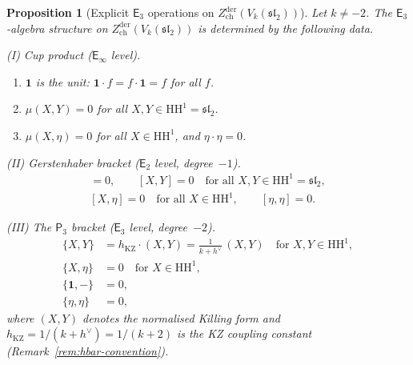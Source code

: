 \documentclass[11pt,reqno]{amsart}
\newtheorem{proposition}[theorem]{Proposition}
\theoremstyle{definition}
\theoremstyle{remark}
\newcommand{\HH}{\mathrm{HH}}
\newcommand{\Etwo}{\mathsf{E}_{2}}
\providecommand{\Ethree}{\mathsf{E}_{3}}
\newcommand{\Einf}{\mathsf{E}_{\infty}}
\newcommand{\Pthree}{\mathsf{P}_{3}}
\numberwithin{equation}{section}
\begin{document}
\begin{proposition}[Explicit $\Ethree$ operations on
$Z^{\mathrm{der}}_{\mathrm{ch}}(V_k(\mathfrak{sl}_2))$]
\label{prop:e3-explicit-sl2}
Let $k \neq -2$.
The $\Ethree$-algebra structure on
$Z^{\mathrm{der}}_{\mathrm{ch}}(V_k(\mathfrak{sl}_2))$
is determined by the following data.

\smallskip
\noindent
\textup{(I) Cup product} ($\Einf$ level).
\begin{enumerate}[label=\textup{(\alph*)}]
\item $\mathbf{1}$ is the unit:
  $\mathbf{1} \cdot f = f \cdot \mathbf{1} = f$ for all $f$.
\item
  $\mu(X, Y) = 0$ for all $X, Y \in \HH^1 = \mathfrak{sl}_2$.
\item
  $\mu(X, \eta) = 0$ for all $X \in \HH^1$, and
  $\eta \cdot \eta = 0$.
\end{enumerate}

\smallskip
\noindent
\textup{(II) Gerstenhaber bracket} ($\Etwo$ level,
degree~$-1$).
\begin{gather*}
  [\mathbf{1}, -] = 0, \qquad
  [X, Y] = 0 \quad \text{for all }
  X, Y \in \HH^1 = \mathfrak{sl}_2, \\
  [X, \eta] = 0 \quad \text{for all } X \in \HH^1,
  \qquad [\eta, \eta] = 0.
\end{gather*}

\smallskip
\noindent
\textup{(III) The $\Pthree$ bracket} ($\Ethree$ level,
degree~$-2$).
\begin{align}
  \label{eq:e3-p3-killing}
  \{X, Y\}
  &= h_{\mathrm{KZ}} \cdot (X, Y)
  = \frac{1}{k + h^\vee}\,(X, Y)
  \quad \text{for } X, Y \in \HH^1,
  \\
  \label{eq:e3-p3-derivation}
  \{X, \eta\}
  &= 0
  \quad \text{for } X \in \HH^1,
  \\
  \label{eq:e3-p3-unit}
  \{\mathbf{1}, -\}
  &= 0,
  \\
  \label{eq:e3-p3-top}
  \{\eta, \eta\}
  &= 0,
\end{align}
where $(X, Y)$ denotes the normalised Killing form
and $h_{\mathrm{KZ}} = 1/(k + h^\vee) = 1/(k + 2)$ is
the KZ coupling constant
\textup{(}Remark~\textup{\ref{rem:hbar-convention}}\textup{)}.
\end{proposition}
\end{document}
